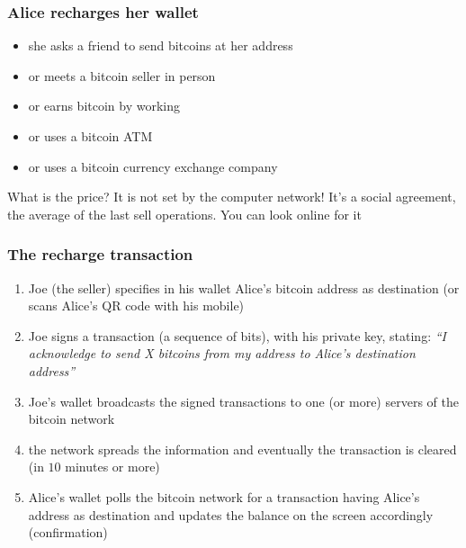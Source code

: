 \documentclass[11pt]{beamer}  %
\begin{document}
\begin{frame}\frametitle{Alice recharges her wallet}
  \begin{itemize}
  \item she asks a friend to send bitcoins at her address
  \item or meets a bitcoin seller in person
  \item or earns bitcoin by working
  \item or uses a bitcoin ATM
  \item or uses a bitcoin currency exchange company
  \end{itemize}

  \bigskip

  \begin{greenbox}{What is the price?}
    It is not set by the computer network! It's a social
    agreement, the average of the last sell operations.
    You can look online for it
  \end{greenbox}

\end{frame}

\begin{frame}\frametitle{The recharge transaction}

  \begin{enumerate}
  \item Joe (the seller) specifies in his wallet Alice's bitcoin address
    as destination (or scans Alice's QR code with his mobile)
  \item Joe signs a transaction (a sequence of bits),
    with his private key, stating: \emph{``I acknowledge
    to send X bitcoins from my address to Alice's destination address''}
  \item Joe's wallet broadcasts the signed transactions
    to one (or more) servers of the bitcoin network
  \item the network spreads the information and eventually the transaction is cleared
    (in $10$ minutes or more)
  \item Alice's wallet polls the bitcoin network for a transaction having
    Alice's address as destination and updates the balance on the screen
    accordingly (\alert{confirmation})
  \end{enumerate}

\end{frame}
\end{document}
